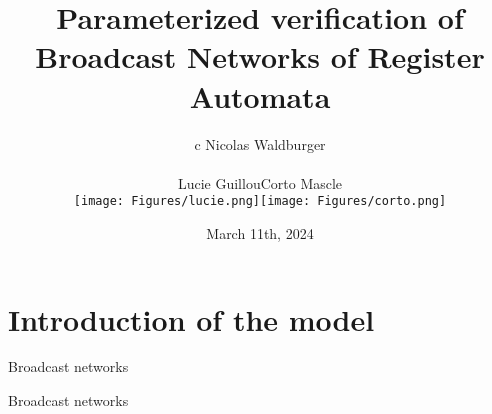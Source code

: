 \documentclass{beamer}
\begin{document}
	\title[Parameterized verification of BNRA]{Parameterized verification of Broadcast Networks of Register Automata}
	\date[]{March 11th, 2024\vspace{-0.5cm}}
	\author[Nicolas Waldburger]{\begin{tabular}{c} Nicolas Waldburger \\
		 \begin{tabular}{ccc}
		Lucie Guillou & Corto Mascle \\
		\texttt{[image: Figures/lucie.png]} & \texttt{[image: Figures/corto.png]} 	\end{tabular} \end{tabular} \vspace{-0.3cm}}
%	
%	
\begin{frame}
	\titlepage
\end{frame}	

\begin{frame}
	\tableofcontents
\end{frame}

\section{Introduction of the model}


\begin{frame}{Broadcast networks}
	\centering
	
\end{frame}


\begin{frame}{Broadcast networks}
	\centering
	
\end{frame}
\end{document}
